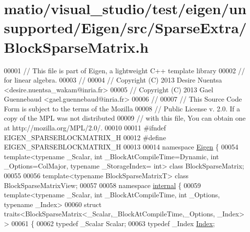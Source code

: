 \hypertarget{matio_2visual__studio_2test_2eigen_2unsupported_2_eigen_2src_2_sparse_extra_2_block_sparse_matrix_8h_source}{}\section{matio/visual\+\_\+studio/test/eigen/unsupported/\+Eigen/src/\+Sparse\+Extra/\+Block\+Sparse\+Matrix.h}
\label{matio_2visual__studio_2test_2eigen_2unsupported_2_eigen_2src_2_sparse_extra_2_block_sparse_matrix_8h_source}

\begin{DoxyCode}
00001 \textcolor{comment}{// This file is part of Eigen, a lightweight C++ template library}
00002 \textcolor{comment}{// for linear algebra.}
00003 \textcolor{comment}{//}
00004 \textcolor{comment}{// Copyright (C) 2013 Desire Nuentsa <desire.nuentsa\_wakam@inria.fr>}
00005 \textcolor{comment}{// Copyright (C) 2013 Gael Guennebaud <gael.guennebaud@inria.fr>}
00006 \textcolor{comment}{//}
00007 \textcolor{comment}{// This Source Code Form is subject to the terms of the Mozilla}
00008 \textcolor{comment}{// Public License v. 2.0. If a copy of the MPL was not distributed}
00009 \textcolor{comment}{// with this file, You can obtain one at http://mozilla.org/MPL/2.0/.}
00010 
00011 \textcolor{preprocessor}{#ifndef EIGEN\_SPARSEBLOCKMATRIX\_H}
00012 \textcolor{preprocessor}{#define EIGEN\_SPARSEBLOCKMATRIX\_H}
00013 
00014 \textcolor{keyword}{namespace }\hyperlink{namespace_eigen}{Eigen} \{ 
00054 \textcolor{keyword}{template}<\textcolor{keyword}{typename} \_Scalar, \textcolor{keywordtype}{int} \_BlockAtCompileTime=Dynamic, \textcolor{keywordtype}{int} \_Options=ColMajor, \textcolor{keyword}{typename} \_StorageIndex=\textcolor{keywordtype}{
      int}> \textcolor{keyword}{class }BlockSparseMatrix;
00055 
00056 \textcolor{keyword}{template}<\textcolor{keyword}{typename} BlockSparseMatrixT> \textcolor{keyword}{class }BlockSparseMatrixView;
00057 
00058 \textcolor{keyword}{namespace }\hyperlink{namespaceinternal}{internal} \{
00059 \textcolor{keyword}{template}<\textcolor{keyword}{typename} \_Scalar, \textcolor{keywordtype}{int} \_BlockAtCompileTime, \textcolor{keywordtype}{int} \_Options, \textcolor{keyword}{typename} \_Index>
00060 \textcolor{keyword}{struct }traits<BlockSparseMatrix<\_Scalar,\_BlockAtCompileTime,\_Options, \_Index> >
00061 \{
00062   \textcolor{keyword}{typedef} \_Scalar Scalar;
00063   \textcolor{keyword}{typedef} \_Index \hyperlink{namespace_eigen_a62e77e0933482dafde8fe197d9a2cfde}{Index};

\end{DoxyCode}
